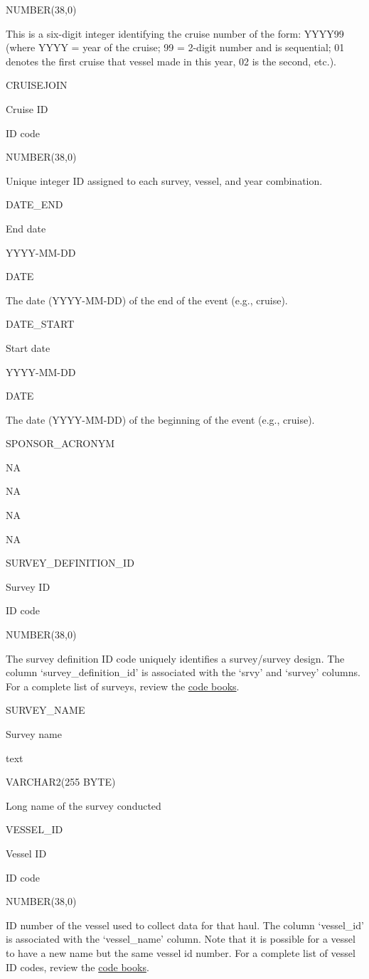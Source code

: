 \documentclass[
  letterpaper,
  oneside,
  open=any]{scrbook}
\begin{document}
NUMBER(38,0)

This is a six-digit integer identifying the cruise number of the form:
YYYY99 (where YYYY = year of the cruise; 99 = 2-digit number and is
sequential; 01 denotes the first cruise that vessel made in this year,
02 is the second, etc.).

CRUISEJOIN

Cruise ID

ID code

NUMBER(38,0)

Unique integer ID assigned to each survey, vessel, and year combination.

DATE\_END

End date

YYYY-MM-DD

DATE

The date (YYYY-MM-DD) of the end of the event (e.g., cruise).

DATE\_START

Start date

YYYY-MM-DD

DATE

The date (YYYY-MM-DD) of the beginning of the event (e.g., cruise).

SPONSOR\_ACRONYM

NA

NA

NA

NA

SURVEY\_DEFINITION\_ID

Survey ID

ID code

NUMBER(38,0)

The survey definition ID code uniquely identifies a survey/survey
design. The column `survey\_definition\_id' is associated with the
`srvy' and `survey' columns. For a complete list of surveys, review the
\href{https://www.fisheries.noaa.gov/resource/document/groundfish-survey-species-code-manual-and-data-codes-manual}{code
books}.

SURVEY\_NAME

Survey name

text

VARCHAR2(255 BYTE)

Long name of the survey conducted

VESSEL\_ID

Vessel ID

ID code

NUMBER(38,0)

ID number of the vessel used to collect data for that haul. The column
`vessel\_id' is associated with the `vessel\_name' column. Note that it
is possible for a vessel to have a new name but the same vessel id
number. For a complete list of vessel ID codes, review the
\href{https://www.fisheries.noaa.gov/resource/document/groundfish-survey-species-code-manual-and-data-codes-manual}{code
books}.
\end{document}
